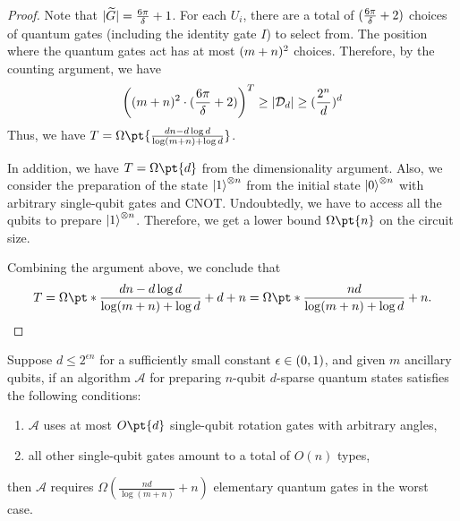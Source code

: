 \documentclass[a4paper,UKenglish,cleveref, autoref, thm-restate]{lipics-v2021}
\DeclarePairedDelimiter\rbra{\lparen}{\rparen}
\DeclarePairedDelimiter\abs{\lvert}{\rvert}
\newcommand{\bo}{O\pt}
\newcommand{\om}{\Omega\pt}
\begin{document}
\begin{proof}
Note that $\abs{\widetilde{G}} = \frac{6\pi}{\delta} + 1$. For each $U_i$, there are a total of $\rbra{\frac{6\pi}{\delta} + 2}$ choices of quantum gates (including the identity gate $I$) to select from. The position where the quantum gates act has at most  $\rbra{m + n}^2$ choices. Therefore, by the counting argument, we have
    \begin{align}
        \rbra*{\rbra{m + n}^2 \cdot \rbra{\frac{6\pi}{\delta} + 2}}^T \geq \abs{\mathcal{D}_d} \geq \rbra{\frac{2^n}{d}}^d
    \end{align}
Thus, we have $T = \om{\frac{dn - d\log d}{\log(m + n) + \log d}}$. 

In addition, we have $T = \om{d}$ from the dimensionality argument. Also,  we consider the preparation of the state $\ket{1}^{\otimes n}$ from the initial state $\ket{0}^{\otimes n}$ with arbitrary single-qubit gates and CNOT. Undoubtedly, we have to access all the qubits to prepare $\ket{1}^{\otimes n}$.  Therefore, we get a lower bound $\om{n}$ on the circuit size.

Combining the argument above, we conclude that
\begin{align}
    T = \om*{\frac{dn - d\log d}{\log(m + n) + \log d} + d + n} = \om*{\frac{nd}{\log(m + n) + \log d} + n}.
\end{align}
\end{proof}

\begin{theorem}
    Suppose $d \leq 2^{\epsilon n}$ for a sufficiently small constant $\epsilon \in \rbra{0, 1}$, and given $m$ ancillary qubits, if an algorithm $\mathcal{A}$ for preparing $n$-qubit $d$-sparse quantum states satisfies the following conditions:
    \begin{enumerate}
        \item $\mathcal{A}$ uses at most $\bo{d}$ single-qubit rotation gates with arbitrary angles,
        \item all other single-qubit gates amount to a total of $O(n)$ types,
    \end{enumerate}
 then $\mathcal{A}$ requires $\Omega(\frac{nd}{\log(m+n)} + n)$ elementary quantum gates in the worst case.
\end{theorem}
\end{document}
